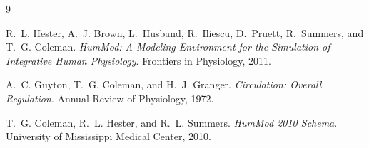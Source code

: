\documentclass[11pt]{article}
\begin{document}
\begin{thebibliography}{9}

R.~L. Hester, A.~J. Brown, L.~Husband, R.~Iliescu, D.~Pruett, R.~Summers, and T.~G. Coleman.
\textit{HumMod: A Modeling Environment for the Simulation of Integrative Human Physiology}.
Frontiers in Physiology, 2011.

A.~C. Guyton, T.~G. Coleman, and H.~J. Granger.
\textit{Circulation: Overall Regulation}.
Annual Review of Physiology, 1972.

T.~G. Coleman, R.~L. Hester, and R.~L. Summers.
\textit{HumMod 2010 Schema}.
University of Mississippi Medical Center, 2010.

\end{thebibliography}
\end{document}
